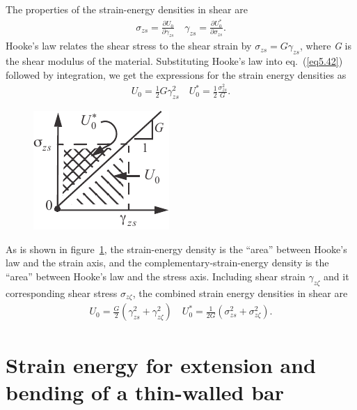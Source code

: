 \documentclass{AeroStructure-ERJohnson}
\begin{document}
The properties of the strain-energy densities in shear are
\begin{align}\label{eq5.42}
\sigma_{z s}=\frac{\partial U_{0}}{\partial \gamma_{z s}} \quad \gamma_{z s}=\frac{\partial U_{0}^{*}}{\partial \sigma_{z s}}.
\end{align}
Hooke's law relates the shear stress to the shear strain by $\sigma_{z s}=G \gamma_{z s}$, where \textit{G} is the shear modulus of the material. Substituting Hooke's law into eq.~(\ref{eq5.42}) followed by integration, we get the expressions for the strain energy densities as
\begin{align}\label{eq5.43}
U_{0}=\frac{1}{2} G \gamma_{z s}^{2} \quad U_{0}^{*}=\frac{1}{2} \frac{\sigma_{z s}^{2}}{G}.
\end{align}
\begin{figure}
\vspace*{-19pt}
\includegraphics{Figure_5-10.pdf}
\caption{ \label{fig5.10}}
\end{figure}
\noindent As is shown in figure~\ref{fig5.10}, the strain-energy density is the ``area'' between Hooke's law and the strain axis, and the complementary-strain-energy density is the ``area'' between Hooke's law and the stress axis. Including shear strain $\gamma_{z \zeta}$ and it corresponding shear stress $\sigma_{z \zeta}$, the combined strain energy densities in shear are
\begin{align}\label{eq5.44}
U_{0}=\frac{G}{2}(\gamma_{z s}^{2}+\gamma_{z \zeta}^{2}) \quad U_{0}^{*}=\frac{1}{2 G}(\sigma_{z s}^{2}+\sigma_{z \zeta}^{2}).
\end{align}

\clearpage

\section{Strain energy for extension and bending of a thin-walled bar}\label{sec5.4}
\end{document}

